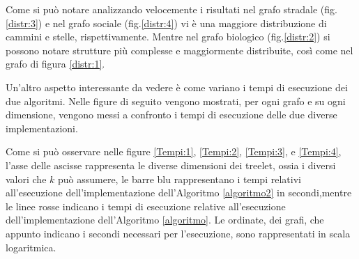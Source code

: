Come si può notare analizzando velocemente i risultati nel grafo stradale (fig.\ref{distr:3}) e nel grafo sociale (fig.\ref{distr:4}) vi è una maggiore distribuzione di cammini e stelle, rispettivamente.
Mentre nel grafo biologico (fig.\ref{distr:2}) si possono notare strutture più complesse e maggiormente distribuite, così come nel grafo di figura \ref{distr:1}.

Un'altro aspetto interessante da vedere è come variano i tempi di esecuzione dei due algoritmi.
Nelle figure di seguito vengono mostrati, per ogni grafo e su ogni dimensione,
vengono messi a confronto i tempi di esecuzione delle due diverse implementazioni.

Come si può osservare nelle figure \ref{Tempi:1}, \ref{Tempi:2}, \ref{Tempi:3}, e \ref{Tempi:4}, l'asse delle ascisse rappresenta le diverse dimensioni dei treelet, ossia i diversi valori che $ k $ può assumere, le barre blu rappresentano i tempi relativi all'esecuzione dell'implementazione dell'Algoritmo \ref{algoritmo2} in secondi,mentre le linee rosse indicano i tempi di esecuzione relative all'esecuzione dell'implementazione dell'Algoritmo \ref{algoritmo}.
Le ordinate, dei grafi, che appunto indicano i secondi necessari per l'esecuzione, sono rappresentati in scala logaritmica.
\\

